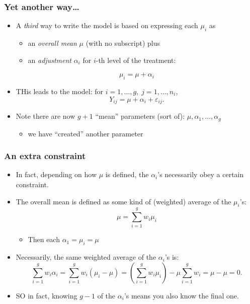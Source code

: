 \documentclass[a4paper]{article}
\begin{document}
\subsubsection{Yet another way\dots}
\begin{itemize}
	\item A \textit{third} way to write the model is based on expressing each \( \mu_i \) as
	\begin{itemize}
		\item an \textit{overall mean} \( \mu \) (with no subscript) plus
		\item an \textit{adjustment} \( \alpha_i \) for \( i \)-th level of the treatment:
	\end{itemize}
	\[
		\mu_i = \mu + \alpha_i
	\]
	\item THis leads to the model: for \( i = 1,\dotsc,g,\;j = 1,\dotsc,n_i \),
	\[
		Y_{ij} = \mu + \alpha_i + \varepsilon_{ij}.
	\]
	\item Note there are now \( g+1 \) ``mean'' parameters (sort of): \( \mu,\alpha_1,\dotsc,\alpha_g \)
	\begin{itemize}
		\item we have ``created'' another parameter
	\end{itemize}
\end{itemize}
\subsubsection{An extra constraint}
\begin{itemize}
	\item In fact, depending on how \( \mu \) is defined, the \( \alpha_i \)'s necessarily obey a certain constraint.
	\item The overall mean is defined as some kind of (weighted) average of the \( \mu_i \)'s:
	\[
		\mu = \sum_{i=1}^{g} w_i \mu_i
	\]
	\begin{itemize}
		\item Then each \( \alpha_1 = \mu_i = \mu \) 
	\end{itemize}
	\item Necessarily, the same weighted average of the \( \alpha_i \)'s is:
	\[
		\sum_{i=1}^gw_i\alpha_i= \sum_{i=1}^gw_i(\mu_i-\mu)= \left(\sum_{i=1}^gw_i\mu_i\right)-\mu\sum_{i=1}^gw_i=\mu-\mu=0.
	\]
	\item SO in fact, knowing \( g-1 \) of the \( \alpha_i \)'s means you also know the final one.
\end{itemize}
\end{document}
